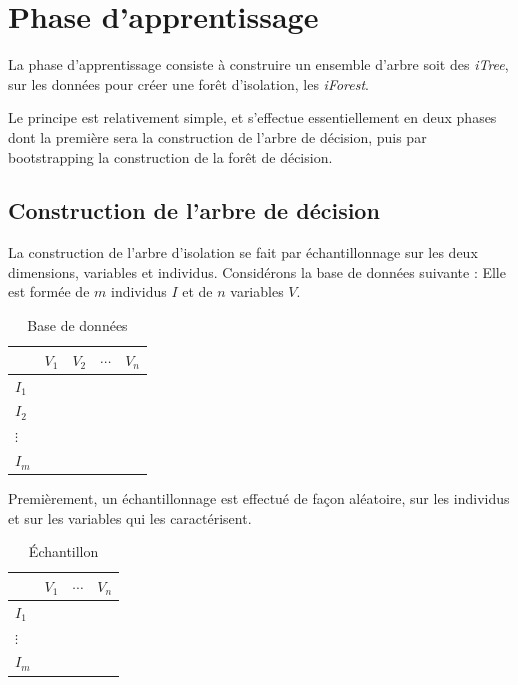 \section{Phase d'apprentissage}

La phase d'apprentissage consiste à construire un ensemble d'arbre soit des \emph{iTree}, sur les données pour créer une forêt d'isolation, les \emph{iForest}.

Le principe est relativement simple, et s'effectue essentiellement en deux phases dont la première sera la construction de l'arbre de décision, puis par bootstrapping la construction de la forêt de décision.

\subsection*{Construction de l'arbre de décision}

La construction de l'arbre d'isolation se fait par échantillonnage sur les deux dimensions, variables et individus.
Considérons la base de données  suivante :
Elle est formée de $m$ individus $I$ et de $n$ variables $V$.

\begin{table}[H]
\centering
\caption{Base de données}
\label{bdd}
\begin{tabular}{|l|l|l|l|l|}
\hline
 & $V_1$ & $V_2$ & $\cdots$ & $V_n$ \\ \hline
$I_1$ &  &  &  &  \\ \hline
$I_2$ &  &  &  &  \\ \hline
$\vdots$ &  &  &  &  \\ \hline
$I_m$ &  &  &  &  \\ \hline
\end{tabular}
\end{table}

Premièrement, un échantillonnage est effectué de façon aléatoire, sur les individus et sur les variables qui les caractérisent.

\begin{table}[H]
\centering
\caption{Échantillon}
\label{ech}
\begin{tabular}{|l|l|l|l|}
\hline
 & $V_1$ &  $\cdots$ & $V_n$ \\ \hline
$I_1$ &  &  &  \\ \hline
$\vdots$ &  &  &  \\ \hline
$I_m$ &  &  &  \\ \hline
\end{tabular}
\end{table}

